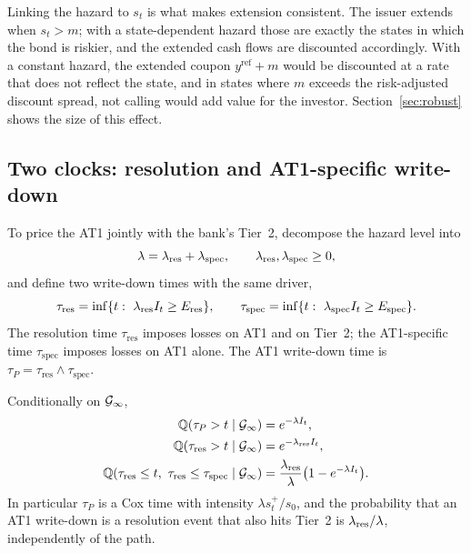 Linking the hazard to $s_t$ is what makes extension consistent. The issuer extends when
$s_t>m$; with a state-dependent hazard those are exactly the states in which the bond is
riskier, and the extended cash flows are discounted accordingly. With a constant hazard,
the extended coupon $y^{\mathrm{ref}}+m$ would be discounted at a rate that does not reflect
the state, and in states where $m$ exceeds the risk-adjusted discount spread, not calling
would add value for the investor. Section~\ref{sec:robust} shows the size of this effect.

\subsection{Two clocks: resolution and AT1-specific write-down}\label{sec:twoclocks}

To price the AT1 jointly with the bank's Tier~2, decompose the hazard level into
\begin{equation}\label{eq:split}
  \lambda=\lambda_{\mathrm{res}}+\lambda_{\mathrm{spec}},\qquad \lambda_{\mathrm{res}},\lambda_{\mathrm{spec}}\ge0,
\end{equation}
and define two write-down times with the same driver,
\begin{equation}\label{eq:clocks}
  \tau_{\mathrm{res}} = \inf\{t:\ \lambda_{\mathrm{res}} I_t\ge E_{\mathrm{res}}\},\qquad
  \tau_{\mathrm{spec}} = \inf\{t:\ \lambda_{\mathrm{spec}} I_t\ge E_{\mathrm{spec}}\}.
\end{equation}
The resolution time $\tau_{\mathrm{res}}$ imposes losses on AT1 and on Tier~2; the
AT1-specific time $\tau_{\mathrm{spec}}$ imposes losses on AT1 alone. The AT1 write-down
time is $\tau_P=\tau_{\mathrm{res}}\wedge\tau_{\mathrm{spec}}$.

\begin{proposition}\label{prop:clocks}
Conditionally on $\mathcal{G}_\infty$,
\begin{align}
  \Q(\tau_P>t\mid\G_\infty) &= e^{-\lambda I_t},\label{eq:survat1}\\
  \Q(\tau_{\mathrm{res}}>t\mid\G_\infty) &= e^{-\lres I_t},\label{eq:survt2}\\
  \Q(\tau_{\mathrm{res}}\le t,\ \tau_{\mathrm{res}}\le\tau_{\mathrm{spec}}\mid\G_\infty)
  &= \frac{\lres}{\lambda}\bigl(1-e^{-\lambda I_t}\bigr).\label{eq:firstres}
\end{align}
In particular $\tau_P$ is a Cox time with intensity $\lambda s_t^+/s_0$, and the
probability that an AT1 write-down is a resolution event that also hits Tier~2 is
$\lambda_{\mathrm{res}}/\lambda$, independently of the path.
\end{proposition}

